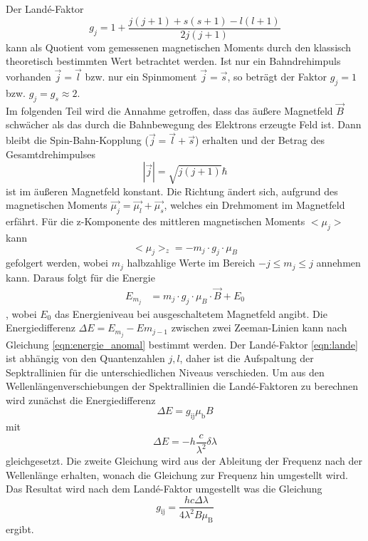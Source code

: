 Der Landé-Faktor
\begin{equation}
    g_j = 1 + \frac{j(j+1) + s(s+1) - l(l+1)}{2j(j+1)}
    \label{eqn:lande}
\end{equation}
kann als Quotient vom gemessenen magnetischen Moments durch den klassisch theoretisch bestimmten Wert betrachtet werden.
Ist nur ein Bahndrehimpuls vorhanden $\vec{j}=\vec{l}$ bzw. nur ein Spinmoment $\vec{j}=\vec{s}$, so beträgt der Faktor $g_j=1$ bzw. $g_j = g_s \approx 2$.
\\
Im folgenden Teil wird die Annahme getroffen, dass das äußere Magnetfeld $\vec{B}$ schwächer als das durch die Bahnbewegung des Elektrons erzeugte Feld ist.
Dann bleibt die Spin-Bahn-Kopplung ($\vec{j}=\vec{l}+\vec{s}$) erhalten und der Betrag des Gesamtdrehimpulses
\begin{equation}
    |\vec{j}| = \sqrt{j(j+1)} \hbar
\end{equation}
ist im äußeren Magnetfeld konstant.
Die Richtung ändert sich, aufgrund des magnetischen Moments $\vec{\mu_j} = \vec{\mu_l} + \vec{\mu_s}$, welches ein Drehmoment im Magnetfeld erfährt.
Für die z-Komponente des mittleren magnetischen Moments $<\mu_j>$ kann
\begin{equation}
    <\mu_j>_z = - m_j \cdot g_j \cdot \mu_B
\end{equation}
gefolgert werden, wobei $m_j$ halbzahlige Werte im Bereich $-j \leq m_j \leq j$ annehmen kann.
Daraus folgt für die Energie
\begin{align}
    E_{m_j} &= m_j \cdot g_j \cdot \mu_B \cdot \vec{B} + E_0
    \label{eqn:energie_anomal}
\end{align}
, wobei $E_0$ das Energieniveau bei ausgeschaltetem Magnetfeld angibt.
Die Energiedifferenz $\Delta E = E_{m_j} - E{m_{j-1}}$ zwischen zwei Zeeman-Linien kann nach Gleichung \eqref{eqn:energie_anomal} bestimmt werden.
Der Landé-Faktor \eqref{eqn:lande} ist abhängig von den Quantenzahlen $j,l$, daher ist die Aufspaltung der Sepktrallinien für die unterschiedlichen Niveaus verschieden.
Um aus den Wellenlängenverschiebungen der Spektrallinien die Landé-Faktoren zu berechnen wird zunächst die Energiedifferenz
\begin{equation*}
    \Delta E = g _\text{ij} \mu _\text{b} B
\end{equation*}
mit 
\begin{equation*}
    \Delta E = -h \frac{c}{\lambda^2} \delta \lambda
\end{equation*}
gleichgesetzt.
Die zweite Gleichung wird aus der Ableitung der Frequenz nach der Wellenlänge erhalten, wonach die Gleichung zur Frequenz hin umgestellt wird.
Das Resultat wird nach dem Landé-Faktor umgestellt was die Gleichung 
\begin{equation}
    g_\text{ij} = \frac{hc \Delta \lambda}{4 \lambda^2 B \mu_\text{B}}
    \label{eq:Lande_Faktor}
\end{equation}
ergibt.